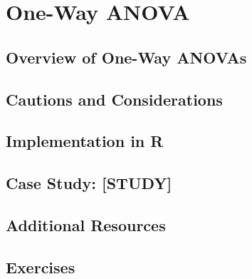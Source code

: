 
\chapter{One-Way ANOVA}

\section{Overview of One-Way ANOVAs}

\section{Cautions and Considerations}

\section{Implementation in R}

\section{Case Study: [STUDY]}

\section{Additional Resources}

\section{Exercises}